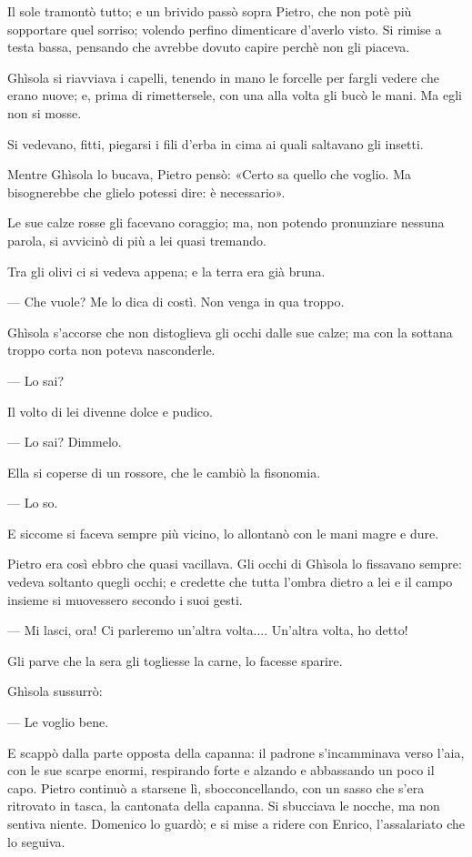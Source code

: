 Il sole tramontò tutto; e un brivido passò sopra Pietro, che non potè più sopportare quel sorriso; volendo perfino dimenticare d'averlo visto. Si rimise a testa bassa, pensando che avrebbe dovuto capire perchè non gli piaceva.

Ghìsola si riavviava i capelli, tenendo in mano le forcelle per fargli vedere che erano nuove; e, prima di rimettersele, con una alla volta gli bucò le mani. Ma egli non si mosse.

Si vedevano, fitti, piegarsi i fili d'erba in cima ai quali saltavano gli insetti.

Mentre Ghìsola lo bucava, Pietro pensò: «Certo sa quello che voglio. Ma bisognerebbe che glielo potessi dire: è necessario».

Le sue calze rosse gli facevano coraggio; ma, non potendo pronunziare nessuna parola, si avvicinò di più a lei quasi tremando.

Tra gli olivi ci si vedeva appena; e la terra era già bruna.

— Che vuole? Me lo dica di costì. Non venga in qua troppo.

Ghìsola s'accorse che non distoglieva gli occhi dalle sue calze; ma con la sottana troppo corta non poteva nasconderle.

— Lo sai?

Il volto di lei divenne dolce e pudico.

— Lo sai? Dimmelo.

Ella si coperse di un rossore, che le cambiò la fisonomia.

— Lo so.

E siccome si faceva sempre più vicino, lo allontanò con le mani magre e dure.

Pietro era così ebbro che quasi vacillava. Gli occhi di Ghìsola lo fissavano sempre: vedeva soltanto quegli occhi; e credette che tutta l'ombra dietro a lei e il campo insieme si muovessero secondo i suoi gesti.

— Mi lasci, ora! Ci parleremo un'altra volta.... Un'altra volta, ho detto!

Gli parve che la sera gli togliesse la carne, lo facesse sparire.

Ghìsola sussurrò:

— Le voglio bene.

E scappò dalla parte opposta della capanna: il padrone s'incamminava verso l'aia, con le sue scarpe enormi, respirando forte e alzando e abbassando un poco il capo. Pietro continuò a starsene lì, sbocconcellando, con un sasso che s'era ritrovato in tasca, la cantonata della capanna. Si sbucciava le nocche, ma non sentiva niente. Domenico lo guardò; e si mise a ridere con Enrico, l'assalariato che lo seguiva.

